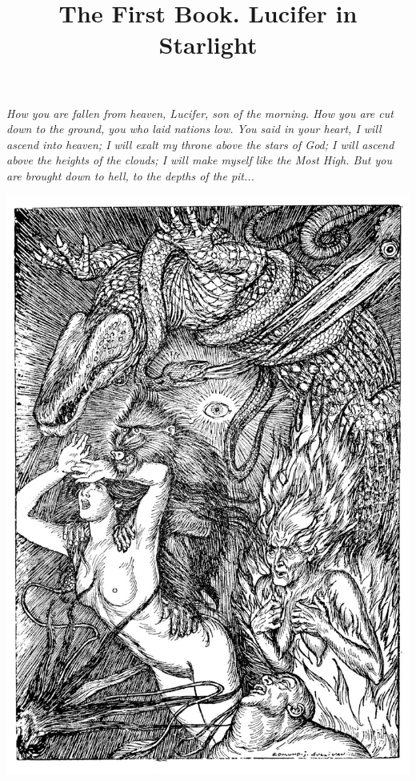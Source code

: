 \documentclass{amsbook}
\title{The First Book. Lucifer in Starlight}
\begin{document}
\frontmatter
\renewcommand\thefootnote{{}}
\maketitle

\thispagestyle{empty}
\vspace*{\fill}
\noindent \textit{How you are fallen from heaven, Lucifer, son of the morning. How you are cut down to the ground, you who laid nations low. You said in your heart, I will ascend into heaven; I will exalt my throne above the stars of God; I will ascend above the heights of the clouds; I will make myself like the Most High. But you are brought down to hell, to the depths of the pit...}
\vspace*{\fill}
\clearpage

\tableofcontents

\thispagestyle{empty}
\vspace*{\fill}
{\centering
\includegraphics[width=\textwidth]{images/rubaiyat.jpg}}
\vspace*{\fill}
\clearpage
\end{document}
